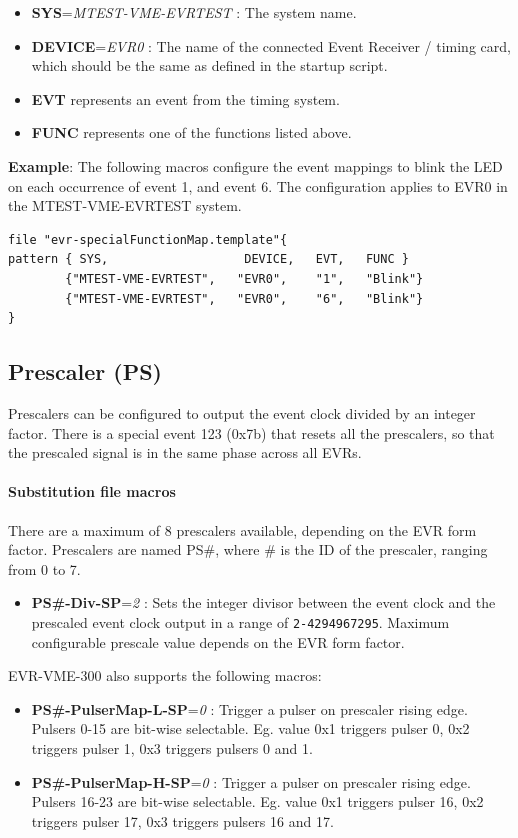 \documentclass[12pt,a4paper]{article}
\begin{document}
\begin{itemize}
\item
	\textbf{SYS}=\emph{MTEST-VME-EVRTEST} : The system name. 
\item
	\textbf{DEVICE}=\emph{EVR0} : The name of the connected Event Receiver / timing card, which should be the same as defined in the startup script. 
\item
  \textbf{EVT} represents an event from the timing system.
\item
  \textbf{FUNC} represents one of the functions listed above.
\end{itemize}

\textbf{Example}: The following macros configure the event mappings to blink the LED on each occurrence of event 1, and event 6. The configuration applies to EVR0 in the MTEST-VME-EVRTEST system.

\begin{verbatim}
file "evr-specialFunctionMap.template"{
pattern { SYS,                   DEVICE,   EVT,   FUNC }
        {"MTEST-VME-EVRTEST",   "EVR0",    "1",   "Blink"}
        {"MTEST-VME-EVRTEST",   "EVR0",    "6",   "Blink"}
}
\end{verbatim}


\subsection{Prescaler (PS)}\label{sec:Prescaler}
Prescalers can be configured to output the event clock divided by an integer factor. There is a special event 123 (0x7b) that resets all the prescalers, so that the prescaled signal is in the same phase across all EVRs.

\paragraph{Substitution file macros}
There are a maximum of 8 prescalers available, depending on the EVR form factor. Prescalers are named PS\#, where \# is the ID of the prescaler, ranging from 0 to 7.
\begin{itemize}
  \item
    \textbf{PS\#-Div-SP}=\emph{2} : Sets the integer divisor between the event clock and the prescaled event clock output in a range of \texttt{2-4294967295}. Maximum configurable prescale value depends on the EVR form factor.
\end{itemize}
EVR-VME-300 also supports the following macros:
\begin{itemize}
  \item
    \textbf{PS\#-PulserMap-L-SP}=\emph{0} : Trigger a pulser on prescaler rising edge. Pulsers 0-15 are bit-wise selectable. Eg. value 0x1 triggers pulser 0, 0x2 triggers pulser 1, 0x3 triggers pulsers 0 and 1.
  \item
    \textbf{PS\#-PulserMap-H-SP}=\emph{0} : Trigger a pulser on prescaler rising edge. Pulsers 16-23 are bit-wise selectable. Eg. value 0x1 triggers pulser 16, 0x2 triggers pulser 17, 0x3 triggers pulsers 16 and 17.
\end{itemize}
\end{document}
